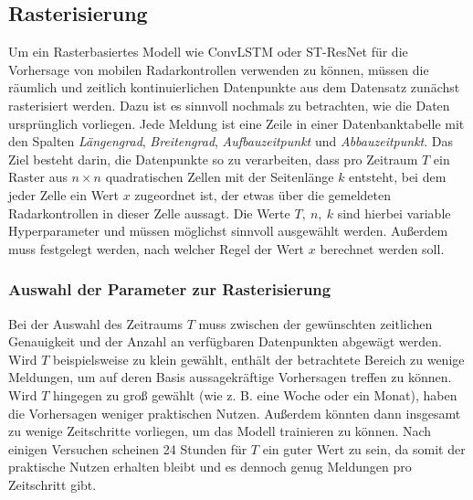 \subsection{Rasterisierung}
\label{sec:Rasterisierung}
Um ein Rasterbasiertes Modell wie ConvLSTM oder ST-ResNet für die Vorhersage von mobilen Radarkontrollen verwenden zu können, müssen die räumlich und zeitlich kontinuierlichen Datenpunkte aus dem Datensatz zunächst rasterisiert werden.
Dazu ist es sinnvoll nochmals zu betrachten, wie die Daten ursprünglich vorliegen.
Jede Meldung ist eine Zeile in einer Datenbanktabelle mit den Spalten \emph{Längengrad}, \emph{Breitengrad}, \emph{Aufbauzeitpunkt} und \emph{Abbauzeitpunkt}.
Das Ziel besteht darin, die Datenpunkte so zu verarbeiten, dass pro Zeitraum $T$ ein Raster aus $n \times n$ quadratischen Zellen mit der Seitenlänge $k$ entsteht, bei dem jeder Zelle ein Wert $x$ zugeordnet ist, der etwas über die gemeldeten Radarkontrollen in dieser Zelle aussagt.
Die Werte $T,~n,~k$ sind hierbei variable Hyperparameter und müssen möglichst sinnvoll ausgewählt werden.
Außerdem muss festgelegt werden, nach welcher Regel der Wert $x$ berechnet werden soll.

\subsubsection{Auswahl der Parameter zur Rasterisierung}
\label{sec:RasterisierungParameter}
Bei der Auswahl des Zeitraums $T$ muss zwischen der gewünschten zeitlichen Genauigkeit und der Anzahl an verfügbaren Datenpunkten abgewägt werden.
Wird $T$ beispielsweise zu klein gewählt, enthält der betrachtete Bereich zu wenige Meldungen, um auf deren Basis aussagekräftige Vorhersagen treffen zu können.
Wird $T$ hingegen zu groß gewählt (wie z. B. eine Woche oder ein Monat), haben die Vorhersagen weniger praktischen Nutzen.
Außerdem könnten dann insgesamt zu wenige Zeitschritte vorliegen, um das Modell trainieren zu können.
Nach einigen Versuchen scheinen 24 Stunden für $T$ ein guter Wert zu sein, da somit der praktische Nutzen erhalten bleibt und es dennoch genug Meldungen pro Zeitschritt gibt.

